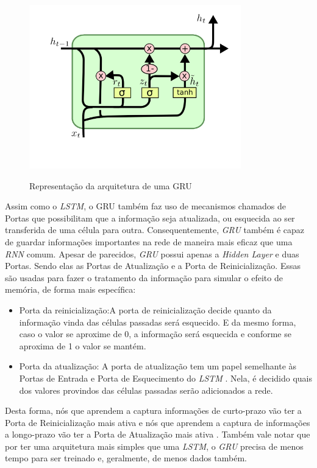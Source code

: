 \begin{figure}[htbp]
    \centering
    \includegraphics[scale=0.8]{monography/img/models/GRU.png}
    \label{figure:gru}
    \caption[Representação da arquitetura de uma GRU]{Representação da arquitetura de uma GRU\footnotemark}
\end{figure}

Assim como o \textit{\acrshort{LSTM}}, o \acrshort{GRU} também faz uso de mecanismos chamados de Portas que possibilitam que a informação seja atualizada, ou esquecida ao ser transferida de uma célula para outra. Consequentemente, \textit{\acrshort{GRU}} também é capaz de guardar informações importantes na rede de maneira mais eficaz que uma \textit{\acrshort{RNN}} comum. Apesar de parecidos, \textit{\acrshort{GRU}} possui apenas a \textit{Hidden Layer} e duas Portas. Sendo elas as Portas de Atualização e a Porta de Reinicialização. Essas são usadas para fazer o tratamento da informação para simular o efeito de memória, de forma mais específica:

\begin{itemize}
    \item Porta da reinicialização:A porta de reinicialização decide quanto da informação vinda das células passadas será esquecido. E da mesmo forma, caso o valor se aproxime de 0, a informação será esquecida e conforme se aproxima de 1 o valor se mantém.

    \item Porta da atualização: A porta de atualização tem um papel semelhante às Portas de Entrada e Porta de Esquecimento do \textit{\acrshort{LSTM}} . Nela, é decidido quais dos valores provindos das células passadas serão adicionados a rede.
\end{itemize}

Desta forma, nós que aprendem a captura informações de curto-prazo vão ter a Porta de Reinicialização mais ativa e nós que aprendem a captura de informações a longo-prazo vão ter a Porta de Atualização mais ativa \cite{cho2014}. Também vale notar que por ter uma arquitetura mais simples que uma \textit{\acrshort{LSTM}}, o \textit{\acrshort{GRU}} precisa de menos tempo para ser treinado e, geralmente, de menos dados também.
